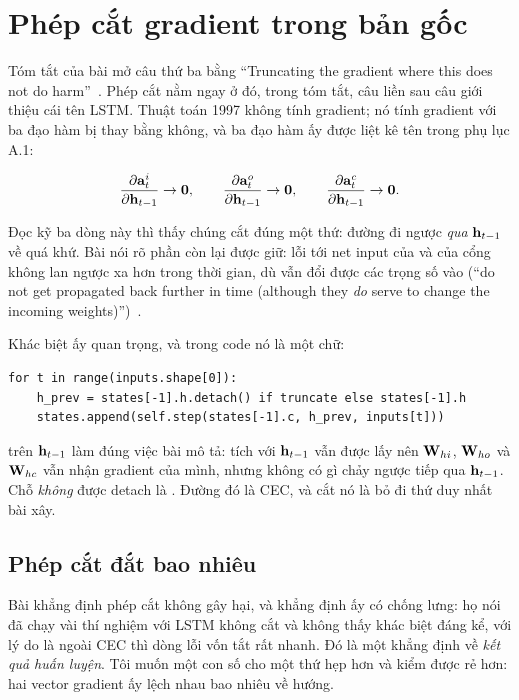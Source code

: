 \section{Phép cắt gradient trong bản gốc}
\label{sec:ch04-cat-gradient}

%
Tóm tắt của bài mở câu thứ ba bằng \enquote{Truncating the gradient where this
does not do harm}~\autocite{hochreiter1997lstm}. Phép cắt nằm ngay ở đó, trong
tóm tắt, câu liền sau câu giới thiệu cái tên LSTM. Thuật toán 1997 không tính
gradient; nó tính gradient với ba đạo hàm bị thay bằng không, và ba đạo hàm ấy
được liệt kê tên trong phụ lục A.1:

\begin{equation}
  \frac{\partial \mathbf{a}^{i}_t}{\partial \mathbf{h}_{t-1}} \to \mathbf{0}, \qquad
  \frac{\partial \mathbf{a}^{o}_t}{\partial \mathbf{h}_{t-1}} \to \mathbf{0}, \qquad
  \frac{\partial \mathbf{a}^{c}_t}{\partial \mathbf{h}_{t-1}} \to \mathbf{0}.
  \label{eq:ch04-ba-phep-the}
\end{equation}

Đọc kỹ ba dòng này thì thấy chúng cắt đúng một thứ: đường đi ngược \emph{qua}
\(\mathbf{h}_{t-1}\) về quá khứ. Bài nói rõ phần còn lại được giữ: lỗi tới
net input của  và của cổng không lan ngược xa hơn trong
thời gian, dù vẫn đổi được các trọng số vào (\enquote{do not get propagated
back further in time (although they \emph{do} serve to change the incoming
weights)})~\autocite{hochreiter1997lstm}.

Khác biệt ấy quan trọng, và trong code nó là một chữ:

\begin{verbatim}
for t in range(inputs.shape[0]):
    h_prev = states[-1].h.detach() if truncate else states[-1].h
    states.append(self.step(states[-1].c, h_prev, inputs[t]))
\end{verbatim}

 trên \(\mathbf{h}_{t-1}\) làm đúng việc bài mô tả: tích với
\(\mathbf{h}_{t-1}\) vẫn được lấy nên \(\mathbf{W}_{hi}\), \(\mathbf{W}_{ho}\) và
\(\mathbf{W}_{hc}\) vẫn nhận gradient của mình, nhưng không có gì chảy ngược tiếp
qua \(\mathbf{h}_{t-1}\). Chỗ \emph{không} được detach là .
Đường đó là CEC, và cắt nó là bỏ đi thứ duy nhất bài xây.

\subsection*{Phép cắt đắt bao nhiêu}

%
Bài khẳng định phép cắt không gây hại, và khẳng định ấy có chống lưng: họ nói
đã chạy vài thí nghiệm với LSTM không cắt và không thấy khác biệt đáng kể, với
lý do là ngoài CEC thì dòng lỗi vốn tắt rất nhanh. Đó là một khẳng định về
\emph{kết quả huấn luyện}. Tôi muốn một con số cho một thứ hẹp hơn và kiểm được
rẻ hơn: hai vector gradient ấy lệch nhau bao nhiêu về hướng.

